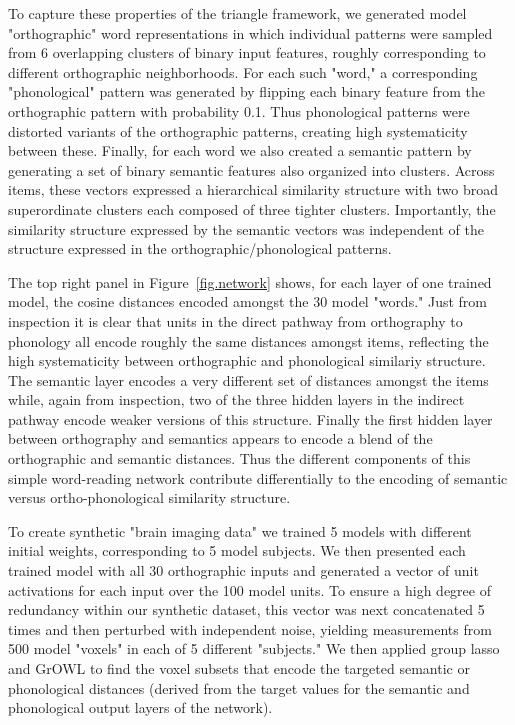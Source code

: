To capture these properties of the triangle framework, we generated model "orthographic"
word representations in which individual patterns were sampled from 6 overlapping clusters
of binary input features, roughly corresponding to different orthographic neighborhoods.
For each such "word," a corresponding "phonological" pattern was generated by flipping each
binary feature from the orthographic pattern with probability 0.1. Thus phonological
patterns were distorted variants of the orthographic patterns, creating high systematicity
between these. Finally, for each word we also created a semantic pattern by generating a
set of binary semantic features also organized into clusters. Across items, these vectors
expressed a hierarchical similarity structure with two broad superordinate clusters each
composed of three tighter clusters. Importantly, the similarity structure expressed by the
semantic vectors was independent of the structure expressed in the
orthographic/phonological patterns. 

The top right panel in Figure~\ref{fig.network} shows, for each layer of one trained model,
the cosine distances encoded amongst the 30 model "words." Just from inspection it is clear
that units in the direct pathway from orthography to phonology all encode roughly the same
distances amongst items, reflecting the high systematicity between orthographic and
phonological similariy structure. The semantic layer encodes a very different set of
distances amongst the items while, again from inspection, two of the three hidden layers in
the indirect pathway encode weaker versions of this structure. Finally the first hidden
layer between orthography and semantics appears to encode a blend of the orthographic and
semantic distances. Thus the different components of this simple word-reading network
contribute differentially to the encoding of semantic versus ortho-phonological similarity
structure. 

To create synthetic "brain imaging data" we trained 5 models with different initial
weights, corresponding to 5 model subjects. We then presented each trained model with all
30 orthographic inputs and generated a vector of unit activations for each input over the
100 model units. To ensure a high degree of redundancy within our synthetic dataset, this
vector was next concatenated 5 times and then perturbed with independent noise, yielding
measurements from 500 model "voxels" in each of 5 different "subjects." We then applied
group lasso and GrOWL to find the voxel subsets that encode the targeted semantic or
phonological distances (derived from the target values for the semantic and phonological
output layers of the network). 

